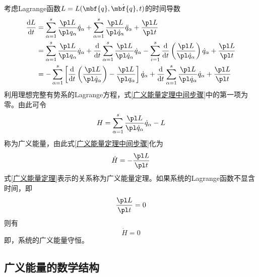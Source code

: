 考虑Lagrange函数$L = L(\mbf{q},\dot{\mbf{q}},t)$的时间导数
\begin{align}
	\frac{\mathrm{d} L}{\mathrm{d} t} & = \sum_{\alpha=1}^s \frac{\pl L}{\pl q_\alpha}\dot{q}_\alpha + \sum_{\alpha=1}^s \frac{\pl L}{\pl \dot{q}_\alpha} \ddot{q}_\alpha + \frac{\pl L}{\pl t} \nonumber \\ 
	& = \sum_{\alpha=1}^s \frac{\pl L}{\pl q_\alpha} \dot{q}_\alpha + \frac{\mathrm{d}}{\mathrm{d} t} \sum_{\alpha=1}^s \frac{\pl L}{\pl \dot{q}_\alpha} \dot{q}_\alpha - \sum_{i=1}^s \frac{\mathrm{d}}{\mathrm{d} t} \left(\frac{\pl L}{\pl \dot{q}_\alpha}\right) \dot{q}_\alpha + \frac{\pl L}{\pl t} \nonumber \\
	& = -\sum_{\alpha=1}^s \left[\frac{\mathrm{d}}{\mathrm{d} t} \left(\frac{\pl L}{\pl \dot{q}_\alpha}\right) - \frac{\pl L}{\pl q_\alpha}\right] \dot{q}_\alpha + \frac{\mathrm{d}}{\mathrm{d} t} \sum_{\alpha=1}^s \frac{\pl L}{\pl \dot{q}_\alpha} \dot{q}_\alpha + \frac{\pl L}{\pl t}
	\label{广义能量定理中间步骤}
\end{align}
利用理想完整有势系的Lagrange方程，式\eqref{广义能量定理中间步骤}中的第一项为零。由此可令
\begin{equation}
	H = \sum_{\alpha=1}^s \frac{\pl L}{\pl \dot{q}_\alpha} \dot{q}_\alpha - L
	\label{广义能量}
\end{equation}
称为{\heiti 广义能量}，由此式\eqref{广义能量定理中间步骤}化为
\begin{equation}
	\dot{H} = -\frac{\pl L}{\pl t}
	\label{广义能量定理}
\end{equation}
式\eqref{广义能量定理}表示的关系称为{\heiti 广义能量定理}。如果系统的Lagrange函数不显含时间，即
\begin{equation*}
	\frac{\pl L}{\pl t} = 0
\end{equation*}
则有
\begin{equation}
	\dot{H} = 0
\end{equation}
即，系统的广义能量守恒。

\subsection{广义能量的数学结构}\label{第二章：广义能量的数学结构}

